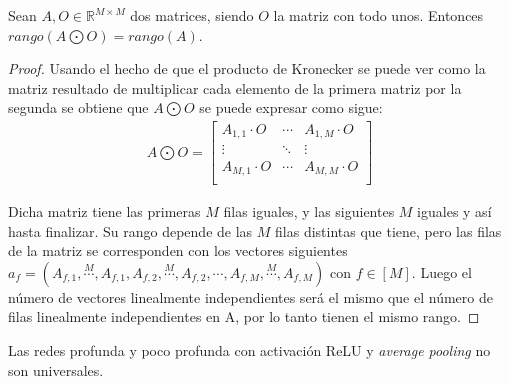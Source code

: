 \begin{lema} \label{lem:rangoIdentidadKronecker}
Sean $A,O\in\mathbb{R}^{M\times M}$ dos matrices, siendo $O$ la matriz con todo unos. Entonces $rango(A\bigodot O) = rango(A)$.
\end{lema}
\begin{proof}
Usando el hecho de que el producto de Kronecker se puede ver como la matriz resultado de multiplicar cada elemento de la primera matriz por la segunda se obtiene que $A\bigodot O$ se puede expresar como sigue:
\begin{align*}
A \bigodot O = 
\begin{bmatrix}
A_{1,1} \cdot O & \cdots  & A_{1,M} \cdot O \\
\vdots & \ddots & \vdots\\
A_{M,1} \cdot O & \cdots  & A_{M,M} \cdot O \\
\end{bmatrix}
\end{align*}

Dicha matriz tiene las primeras $M$ filas iguales, y las siguientes $M$ iguales y así hasta finalizar. Su rango depende de las $M$ filas distintas que tiene, pero las filas de la matriz se corresponden con los vectores siguientes \\ $a_f = (A_{f,1}, \overset{M}{\cdots },A_{f,1},A_{f,2},\overset{M}{\cdots }, A_{f,2},\cdots ,A_{f,M}, \overset{M}{\cdots },A_{f,M})$ con $f\in[M]$. Luego el número de vectores linealmente independientes será el mismo que el número de filas linealmente independientes en A, por lo tanto tienen el mismo rango.

\end{proof}
\begin{prop} \label{prop:noUniversalRed}
Las redes profunda y poco profunda con activación ReLU y \textit{average pooling} no son universales. 
\end{prop} 	

